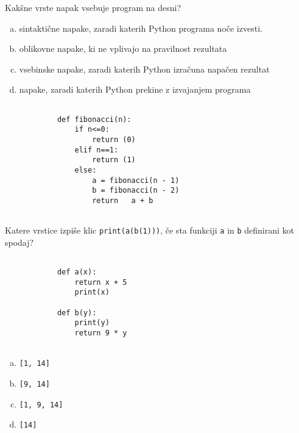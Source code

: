\documentclass[arhiv, 10pt]{../izpit}
\newcommand{\inlinepy}[1]{\texttt{#1}}
\begin{document}
        \naloga*
        \begin{multicols}{2}
        \noindent
        Kakšne vrste napak vsebuje program na desni?

        \begin{enumerate}[(a)]
\item sintaktične napake, zaradi katerih Python programa noče izvesti.
\item oblikovne napake, ki ne vplivajo na pravilnost rezultata
\item vsebinske napake, zaradi katerih Python izračuna napačen rezultat
\item napake, zaradi katerih Python prekine z izvajanjem programa
\end{enumerate}

        \columnbreak

        \begin{verbatim}
        
            def fibonacci(n):
                if n<=0:
                    return (0)
                elif n==1:
                    return (1)
                else:
                    a = fibonacci(n - 1)
                    b = fibonacci(n - 2)
                    return   a + b
            
        \end{verbatim}

        \end{multicols}

    
        \naloga*
        Katere vrstice izpiše klic \inlinepy{print(a(b(1)))}, če sta funkciji \inlinepy{a} in \inlinepy{b} definirani kot spodaj?

        \begin{multicols}{2}
        \begin{verbatim}
        
            def a(x):
                return x + 5
                print(x)

            def b(y):
                print(y)
                return 9 * y
        
        \end{verbatim}

        \begin{enumerate}[(a)]
\item \inlinepy{[1, 14]}
\item \inlinepy{[9, 14]}
\item \inlinepy{[1, 9, 14]}
\item \inlinepy{[14]}
\end{enumerate}

        \end{multicols}
    
\end{document}
